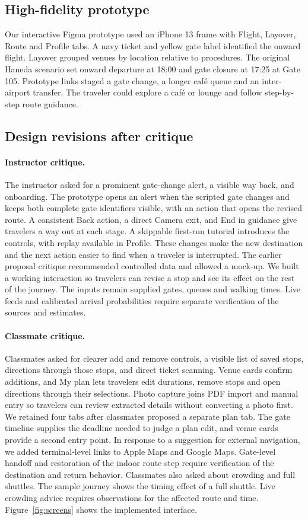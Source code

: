 \documentclass[sigconf,nonacm,balance=false]{acmart}
\begin{document}
\subsection{High-fidelity prototype}
Our interactive Figma prototype used an iPhone 13 frame with Flight, Layover, Route and Profile tabs. A navy ticket and yellow gate label identified the onward flight. Layover grouped venues by location relative to procedures. The original Haneda scenario set onward departure at 18:00 and gate closure at 17:25 at Gate 105. Prototype links staged a gate change, a longer caf\'e queue and an inter-airport transfer. The traveler could explore a caf\'e or lounge and follow step-by-step route guidance.

\subsection{Design revisions after critique}
\paragraph{Instructor critique.} The instructor asked for a prominent gate-change alert, a visible way back, and onboarding. The prototype opens an alert when the scripted gate changes and keeps both complete gate identifiers visible, with an action that opens the revised route. A consistent Back action, a direct Camera exit, and End in guidance give travelers a way out at each stage. A skippable first-run tutorial introduces the controls, with replay available in Profile. These changes make the new destination and the next action easier to find when a traveler is interrupted. The earlier proposal critique recommended controlled data and allowed a mock-up. We built a working interaction so travelers can revise a stop and see its effect on the rest of the journey. The inputs remain supplied gates, queues and walking times. Live feeds and calibrated arrival probabilities require separate verification of the sources and estimates.

\paragraph{Classmate critique.} Classmates asked for clearer add and remove controls, a visible list of saved stops, directions through those stops, and direct ticket scanning. Venue cards confirm additions, and My plan lets travelers edit durations, remove stops and open directions through their selections. Photo capture joins PDF import and manual entry so travelers can review extracted details without converting a photo first. We retained four tabs after classmates proposed a separate plan tab. The gate timeline supplies the deadline needed to judge a plan edit, and venue cards provide a second entry point. In response to a suggestion for external navigation, we added terminal-level links to Apple Maps and Google Maps. Gate-level handoff and restoration of the indoor route step require verification of the destination and return behavior. Classmates also asked about crowding and full shuttles. The sample journey shows the timing effect of a full shuttle. Live crowding advice requires observations for the affected route and time. Figure~\ref{fig:screens} shows the implemented interface.
\end{document}
